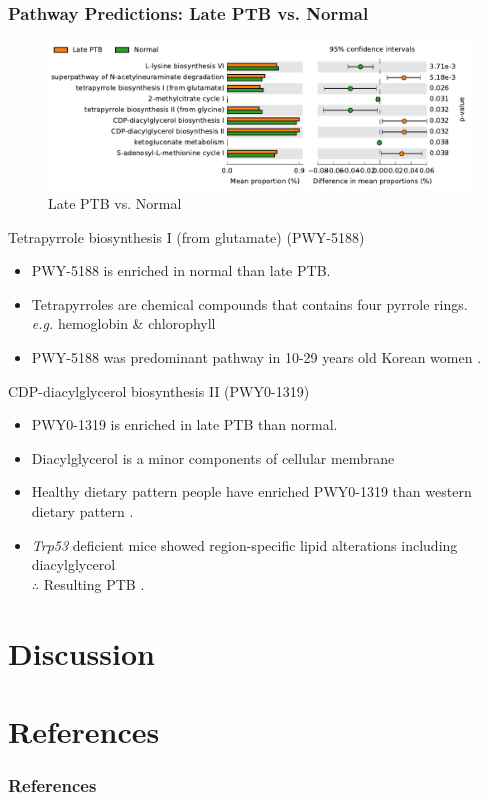 \documentclass{beamer}
\begin{document}
    \begin{frame}[allowframebreaks]
        \frametitle{Pathway Predictions: Late PTB vs. Normal}

        \begin{figure}
            \includegraphics[width=0.9 \linewidth]{figures/PICRUSt2/LF.pdf}
            \caption{Late PTB vs. Normal}
        \end{figure}

        \begin{block}{Tetrapyrrole biosynthesis I (from glutamate) (PWY-5188)}
            \begin{itemize}
                \item PWY-5188 is enriched in normal than late PTB.
                \item Tetrapyrroles are chemical compounds that contains four pyrrole rings. \\
                    \textit{e.g.} hemoglobin \& chlorophyll
                \item PWY-5188 was predominant pathway in 10-29 years old Korean women \cite{PWY-5188-1}.
            \end{itemize}
        \end{block}

        \begin{block}{CDP-diacylglycerol biosynthesis II (PWY0-1319)}
            \begin{itemize}
                \item PWY0-1319 is enriched in late PTB than normal.
                \item Diacylglycerol is a minor components of cellular membrane
                \item Healthy dietary pattern people have enriched PWY0-1319 than western dietary pattern \cite{PWY0-1319-1}.
                \item \textit{Trp53} deficient mice showed region-specific lipid alterations including diacylglycerol \\
                    $\therefore$ Resulting PTB \cite{PWY0-1319-2}.
            \end{itemize}
        \end{block}
    \end{frame}

    \section{Discussion}

    \section{References}
   	\begin{frame}[allowframebreaks]
        \frametitle{References}
        
        
    \end{frame}
\end{document}
